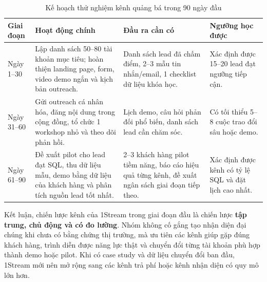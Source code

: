 \begin{table}[H]
    \centering
    \small
    \setlength{\tabcolsep}{4pt}
    \renewcommand{\arraystretch}{1.2}
    \caption{Kế hoạch thử nghiệm kênh quảng bá trong 90 ngày đầu}
    \label{tab:channel-90-day-test-1stream}
    \begin{tabularx}{\linewidth}{@{}L{2.3cm}Y Y L{3.0cm}@{}}
        \toprule
        \textbf{Giai đoạn} & \textbf{Hoạt động chính} & \textbf{Đầu ra cần có} & \textbf{Ngưỡng học được} \\ \midrule

        Ngày 1--30 &
        Lập danh sách 50--80 tài khoản mục tiêu; hoàn thiện landing page, form,
        video demo ngắn và kịch bản outreach. &
        Danh sách lead đã chấm điểm, 2--3 mẫu tin nhắn/email, 1 checklist dữ liệu
        khóa học. &
        Xác định được 15--20 lead đạt ngưỡng tiếp cận. \\

        Ngày 31--60 &
        Gửi outreach cá nhân hóa, đăng nội dung trong cộng đồng, tổ chức 1 workshop
        nhỏ và theo dõi phản hồi. &
        Lịch demo, câu hỏi phản đối phổ biến, danh sách lead cần chăm sóc. &
        Có tối thiểu 5--8 cuộc trao đổi sâu hoặc demo. \\

        Ngày 61--90 &
        Đề xuất pilot cho lead đạt SQL, thu dữ liệu mẫu, demo bằng dữ liệu của
        khách hàng và phân tích nguồn lead tốt nhất. &
        2--3 khách hàng pilot tiềm năng, báo cáo hiệu quả từng kênh, đề xuất ngân
        sách giai đoạn tiếp theo. &
        Xác định được kênh có tỷ lệ SQL và đặt lịch cao nhất. \\ \bottomrule
    \end{tabularx}
\end{table}

Kết luận, chiến lược kênh của 1Stream trong giai đoạn đầu là chiến lược
\textbf{tập trung, chủ động và có đo lường}. Nhóm không cố gắng tạo nhận diện đại
chúng khi chưa có bằng chứng thị trường, mà ưu tiên các kênh giúp gặp đúng khách
hàng, trình diễn được năng lực thật và chuyển đổi từng tài khoản phù hợp thành
demo hoặc pilot. Khi có case study và dữ liệu chuyển đổi ban đầu, 1Stream mới nên
mở rộng sang các kênh trả phí hoặc kênh nhận diện có quy mô lớn hơn.
